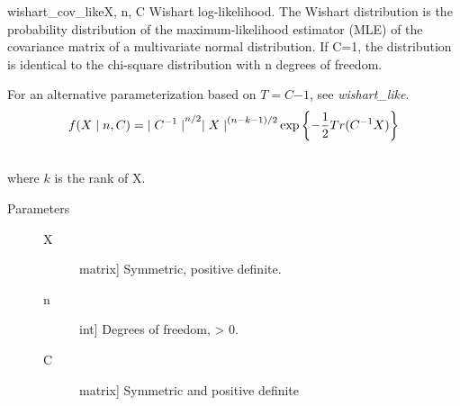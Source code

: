 \hypertarget{pymc.distributions.wishart_cov_like}{}\begin{funcdesc}{wishart\_cov\_like}{X, n, C}
Wishart log-likelihood. The Wishart distribution is the probability
distribution of the maximum-likelihood estimator (MLE) of the covariance
matrix of a multivariate normal distribution. If C=1, the distribution
is identical to the chi-square distribution with n degrees of freedom.

For an alternative parameterization based on $T=C{-1}$, see
\emph{wishart\_like}.
\begin{gather}
\begin{split}f(X \mid n, C) = {\mid C^{-1} \mid}^{n/2}{\mid X \mid}^{(n-k-1)/2} \exp\left\{ -\frac{1}{2} Tr(C^{-1}X) \right\}\end{split}\notag\\\begin{split}\end{split}\notag
\end{gather}
where $k$ is the rank of X.
\begin{description}
\item[Parameters] \leavevmode\begin{description}
\item[X] \leavevmode{[}matrix{]}
Symmetric, positive definite.

\item[n] \leavevmode{[}int{]}
Degrees of freedom, \textgreater{} 0.

\item[C] \leavevmode{[}matrix{]}
Symmetric and positive definite

\end{description}

\end{description}
\end{funcdesc}
\normal
